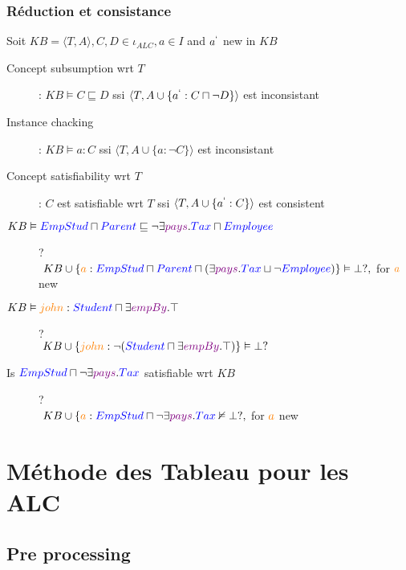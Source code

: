 \subsection{Réduction et consistance}
Soit $KB = \langle T,A \rangle , C, D \in \iota_{ALC}, a \in I$ and $ a^` $ new in $KB$\\
\begin{description}
\item[Concept subsumption wrt $T$]: $KB \vDash C \sqsubseteq D$ ssi $\langle T, A \cup \{ a^` : C \sqcap \neg D \} \rangle$ est inconsistant
\item[Instance chacking]: $KB \vDash a : C$ ssi $\langle T, A \cup \{ a : \neg C \} \rangle$ est inconsistant
\item[Concept satisfiability wrt $T$]: $C$ est satisfiable wrt $T$ ssi $\langle T,A \cup \{ a^` : C \} \rangle$ est consistent
\end{description}
\begin{description}
\item[$KB \vDash \textcolor{blue}{EmpStud} \sqcap \textcolor{blue}{Parent} \sqsubseteq \neg \exists \textcolor{violet}{pays}.\textcolor{blue}{Tax} \sqcap \textcolor{blue}{Employee} $]?\\ $\ KB \cup \{ \textcolor{orange}{a} : \textcolor{blue}{EmpStud} \sqcap \textcolor{blue}{Parent} \sqcap (\exists \textcolor{violet}{pays}.\textcolor{blue}{Tax} \sqcup \neg \textcolor{blue}{Employee} ) \} \vDash \bot ?,$ for $\textcolor{orange}{a}$ new
\item[$KB \vDash \textcolor{orange}{john} : \textcolor{blue}{Student} \sqcap \exists \textcolor{violet}{empBy}.\top $]?\\  $\ KB \cup \{ \textcolor{orange}{john} : \neg (\textcolor{blue}{Student} \sqcap \exists \textcolor{violet}{empBy}.\top)\} \vDash \bot ?$
\item[Is $\textcolor{blue}{EmpStud} \sqcap \neg \exists \textcolor{violet}{pays}.\textcolor{blue}{Tax}$ satisfiable wrt $KB$ ]?\\ $\ KB \cup \{ \textcolor{orange}{a} : \textcolor{blue}{EmpStud} \sqcap \neg \exists \textcolor{violet}{pays}.\textcolor{blue}{Tax} \nvDash \bot ?,$ for $\textcolor{orange}{a}$ new
\end{description}

\chapter{Méthode des Tableau pour les ALC}\pagebreak
\section{Pre processing}
